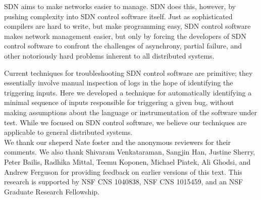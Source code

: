 
SDN aims to make networks easier to manage. SDN
does this, however, by pushing complexity into SDN control software itself. Just
as sophisticated compilers are hard to write, but make programming easy, SDN
control software makes network management easier, but only by forcing the
developers of SDN control software to confront the challenges of asynchrony,
partial failure, and other notoriously hard problems inherent to all distributed
systems.

Current techniques for troubleshooting SDN control software are primitive; they
essentially involve manual inspection of logs in the hope of identifying the
triggering inputs. Here we developed a technique for automatically
identifying a minimal sequence of inputs responsible for triggering a given
bug, without making assumptions about the language or instrumentation of the
software under test. While we focused on SDN control software, we believe our
techniques are applicable to general distributed systems. \\
%
%
%

 We thank our sheperd Nate foster and the
anonymous reviewers for their comments.
We also thank Shivaram Venkataraman, Sangjin Han, Justine Sherry, Peter Bailis, Radhika Mittal, Teemu
Koponen, Michael Piatek, Ali Ghodsi, and Andrew Ferguson for providing feedback on earlier versions of this
text. This research is supported by NSF CNS
1040838, NSF CNS 1015459, and an NSF Graduate Research Fellowship.
\vspace{-0.4em}

